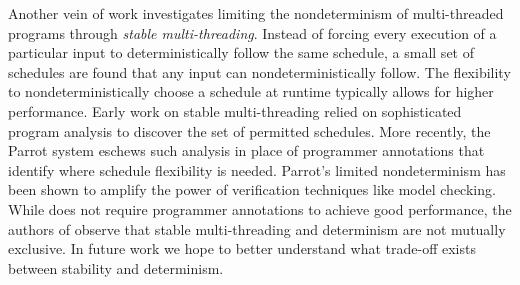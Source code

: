 Another vein of work investigates limiting the nondeterminism of multi-threaded programs through \emph{stable multi-threading}. Instead of forcing every execution of a particular input to deterministically follow the same schedule, a small set of schedules are found that any input can nondeterministically follow. The flexibility to nondeterministically choose a schedule at runtime typically allows for higher performance. Early work on stable multi-threading relied on sophisticated program analysis \cite{heming_cui_stable_2010,heming_cui_efficient_2011,bergan_input-covering_2013} to discover the set of permitted schedules. More recently, the Parrot \cite{cui_parrot:_2013} system eschews such analysis in place of programmer annotations that identify where schedule flexibility is needed. Parrot's limited nondeterminism has been shown to amplify the power of verification techniques like model checking. While \lib does not require programmer annotations to achieve good performance, the authors of \cite{cui_parrot:_2013} observe that stable multi-threading and determinism are not mutually exclusive. In future work we hope to better understand what trade-off exists between stability and determinism.

